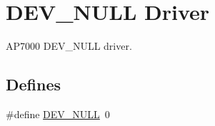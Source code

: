\hypertarget{group___d_e_v___n_u_l_l___d_r_i_v_e_r}{
\section{DEV\_\-NULL Driver}
\label{group___d_e_v___n_u_l_l___d_r_i_v_e_r}
}
AP7000 DEV\_\-NULL driver.  


\subsection*{Defines}
\begin{CompactItemize}
\item 
\#define \hyperlink{group___d_e_v___n_u_l_l___d_r_i_v_e_r_g8a3ec48b54d63808ed4c386c320fed47}{DEV\_\-NULL}~0
\end{CompactItemize}
